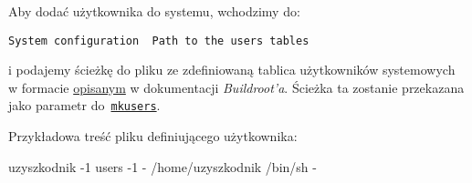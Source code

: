 \documentclass{article}
\newenvironment{textfile}{\ttfamily}{\par}
\begin{document}
Aby dodać użytkownika do systemu, wchodzimy do:

\begin{center}
\texttt{System configuration \textrightarrow\ Path to the users tables}
\end{center}

\noindent i podajemy ścieżkę do pliku ze zdefiniowaną tablica użytkowników systemowych w formacie \href{https://buildroot.org/downloads/manual/manual.html#makeuser-syntax}{opisanym} w dokumentacji \emph{Buildroot'a}. Ścieżka ta zostanie przekazana jako parametr do~\href{https://github.com/maximeh/buildroot/blob/master/support/scripts/mkusers}{\texttt{mkusers}}.

\noindent Przykładowa treść pliku definiującego użytkownika:

\begin{center}
\begin{textfile}
uzyszkodnik -1 users -1 - /home/uzyszkodnik /bin/sh -
\end{textfile}
\end{center}


%
%
\end{document}
